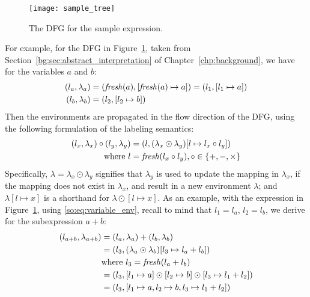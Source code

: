\begin{figure}[ht]
    \centering
    \texttt{[image: sample\_tree]}
    \caption{The DFG for the sample expression.}\label{so:fig:sample_tree}
\end{figure}
For example, for the DFG in Figure~\ref{so:fig:sample_tree}, taken from
Section~\ref{bg:sec:abstract_interpretation} of Chapter~\ref{chp:background},
we have for the variables $a$ and $b$:
\begin{equation}
    \begin{aligned}
        (l_a, \lambda_a) &= (\operatorname{\mathit{fresh}}(a), [\operatorname{\mathit{fresh}}(a)\mapsto{a}])
                   = (l_1, [l_1 \mapsto a]) \\
        (l_b, \lambda_b) &= (l_2, [l_2 \mapsto b])
    \end{aligned}
    \label{so:eq:variable_env}
\end{equation}
Then the environments are propagated in the flow direction of the DFG, using
the following formulation of the labeling semantics:
\begin{equation}
    \begin{aligned}
        (l_x, \lambda_x) \circ (l_y, \lambda_y)
            &= (l, (\lambda_x\odot\lambda_y)
                      [l\mapsto{l_x \circ l_y}]) \\
            \text{where~} l &= \operatorname{\mathit{fresh}}(l_x \circ l_y),
                          \circ\in\{+, -, \times\}
    \end{aligned}
    \label{so:eq:labeling_semantics}
\end{equation}
Specifically, $\lambda=\lambda_x\odot\lambda_y$ signifies that $\lambda_y$
is used to update the mapping in $\lambda_x$, if the mapping does not
exist in $\lambda_x$, and result in a new environment $\lambda$; and
$\lambda[l\mapsto{x}]$ is a shorthand for $\lambda\odot[l\mapsto{x}]$.  As
an example, with the expression in Figure~\ref{so:fig:sample_tree}, using
\eqref{so:eq:variable_env}, recall to mind that $l_1 = l_a$, $l_2 = l_b$, we
derive for the subexpression $a + b$:
\begin{equation}
    \begin{aligned}
        (l_{a + b}, \lambda_{a + b})
            &= (l_a, \lambda_a) + (l_b, \lambda_b) \\
            &= (l_3, (\lambda_a \odot \lambda_b) [l_3\mapsto{l_a + l_b}]) \\
            &  \text{where~} l_3 = \operatorname{\mathit{fresh}}(l_a + l_b) \\
            &= (l_3, [l_1\mapsto{a}]\odot
                     [l_2\mapsto{b}]\odot
                     [l_3\mapsto{l_1 + l_2}]) \\
            &= (l_3, [l_1\mapsto{a}, l_2\mapsto{b}, l_3\mapsto{l_1 + l_2}])
    \end{aligned}
\end{equation}
